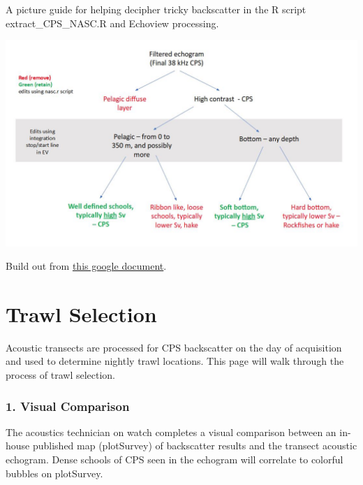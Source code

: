 \documentclass[
  letterpaper,
  oneside,
  open=any]{scrbook}
\begin{document}
A picture guide for helping decipher tricky backscatter in the R script
extract\_CPS\_NASC.R and Echoview processing.

\includegraphics{content/images/backscatter_decision_tree.JPG}

Build out from
\href{https://docs.google.com/document/d/1-YxJs1veotnSZJIWPH6vJjYOA5Dt1iETaqmNv8eNoTk/edit?tab=t.0}{this
google document}.


\chapter{Trawl Selection}\label{trawl-selection}

Acoustic transects are processed for CPS backscatter on the day of
acquisition and used to determine nightly trawl locations. This page
will walk through the process of trawl selection.

\subsection{\texorpdfstring{\textbf{1. Visual
Comparison}}{1. Visual Comparison}}\label{visual-comparison}

The acoustics technician on watch completes a visual comparison between
an in-house published map (plotSurvey) of backscatter results and the
transect acoustic echogram. Dense schools of CPS seen in the echogram
will correlate to colorful bubbles on plotSurvey.
\end{document}
